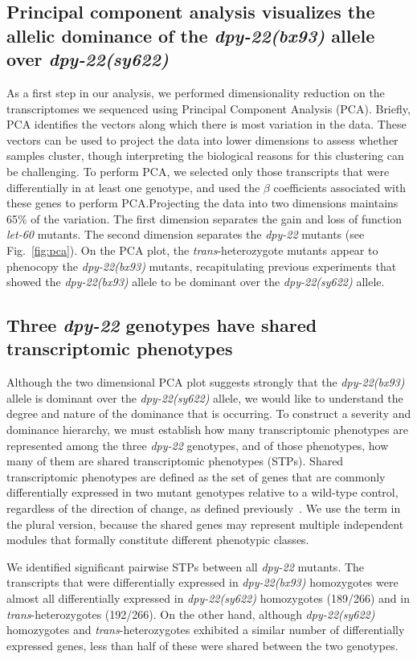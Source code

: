 \documentclass[8pt, twocolumn]{article}
\newcommand{\gene}[1]{\mbox{\emph{#1}}}
\newcommand{\dpy}[1]{\gene{dpy-22#1}}
\newcommand{\weakn}{266}
\newcommand{\bx}{\dpy{(bx93)}}
\newcommand{\sy}{\dpy{(sy622)}}
\begin{document}
\subsection*{Principal component analysis visualizes the allelic dominance of
             the \bx{} allele over \sy{}}
As a first step in our analysis, we performed dimensionality reduction on the
transcriptomes we sequenced using Principal Component Analysis (PCA). Briefly,
PCA identifies the vectors along which there is most variation in the data.
These vectors can be used to project the data into lower dimensions to assess
whether samples cluster, though interpreting the biological reasons for this
clustering can be challenging. To perform PCA, we selected only those
transcripts that were differentially in at least one genotype, and used the
$\beta$ coefficients associated with these genes to perform PCA.\@ Projecting
the data into two dimensions maintains 65\% of the variation. The first
dimension separates the gain and loss of function \gene{let-60} mutants. The
second dimension separates the \dpy{} mutants (see Fig.~\ref{fig:pca}). On the
PCA plot, the \emph{trans}-heterozygote mutants appear to phenocopy the \bx{}
mutants, recapitulating previous experiments that showed the \bx{} allele to be
dominant over the \sy{} allele.

\subsection*{Three \dpy{} genotypes have shared transcriptomic
             phenotypes}
Although the two dimensional PCA plot suggests strongly that the \bx{} allele is
dominant over the \sy{} allele, we would like to understand the degree and
nature of the dominance that is occurring. To construct a severity and dominance
hierarchy, we must establish how many transcriptomic phenotypes are
represented among the three \dpy{} genotypes, and of those phenotypes, how many
of them are shared transcriptomic phenotypes (STPs). Shared transcriptomic
phenotypes are defined as the set of genes that are commonly differentially
expressed in two mutant genotypes relative to a wild-type control, regardless
of the direction of change, as defined previously~\cite{AngelesAlboresHIF}. We
use the term in the plural version, because the shared genes may represent
multiple independent modules that formally constitute different phenotypic
classes.

We identified significant pairwise STPs between all \dpy{} mutants. The
transcripts that were differentially expressed in \bx{} homozygotes were almost
all differentially expressed in \sy{} homozygotes (189/\weakn{}) and in
\emph{trans}-heterozygotes (192/\weakn{}). On the other hand, although \sy{}
homozygotes and \emph{trans}-heterozygotes exhibited a similar number of
differentially expressed genes, less than half of these were shared between the
two genotypes.
\end{document}
